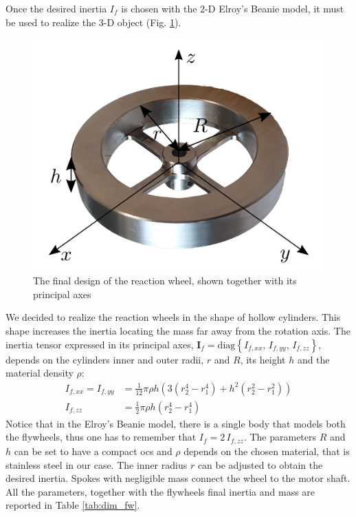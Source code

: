 \documentclass[journal,letterpaper]{IEEEtran}
\begin{document}
Once the desired inertia $I_f$ is chosen with the 2-D Elroy's Beanie model, it must be used to realize the 3-D object (Fig. \ref{fig:flywheel}). 
\begin{figure}
	\centering
	\includegraphics[width=0.7\linewidth]{figures/flywheel.png}
	\caption{The final design of the reaction wheel, shown together with its principal axes}
	\label{fig:flywheel}
\end{figure}
We decided to realize the reaction wheels in the shape of hollow cylinders. This shape increases the inertia locating the mass far away from the rotation axis. The inertia tensor expressed in its principal axes, $\bm{I}_f = \mathrm{diag}\left\{ I_{f, xx}, \, I_{f, yy}, \, I_{f, zz}  \right\}$, depends on the cylinders inner and outer radii, $r$ and $R$, its height $h$ and the material density $\rho$:
\begin{equation}
	\begin{split}
	I_{f, xx} = I_{f, yy} &= \frac{1}{12}\pi \rho h \left(3\left(r_2^4 - r_1^4\right) + h^2\left(r_2^2 - r_1^2\right)\right) \\
	I_{f, zz} &= \frac{1}{2}\pi \rho h \left(r_2^4 - r_1^4\right)
	\end{split}
\end{equation}
Notice that in the Elroy's Beanie model, there is a single body that models both the flywheels, thus one has to remember that $I_f = 2 \, I_{f, zz}$.
The parameters $R$ and $h$ can be set to have a compact \acrshort{ocs} and $\rho$ depends on the chosen material, that is stainless steel in our case. The inner radius $r$ can be adjusted to obtain the desired inertia. Spokes with negligible mass connect the wheel to the motor shaft. All the parameters, together with the flywheels final inertia and mass are reported in Table \ref{tab:dim_fw}.
\end{document}
